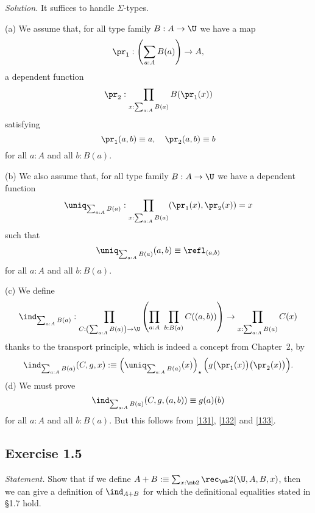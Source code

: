 \documentclass[12pt]{article}
\begin{document}
\nn\emph{Solution.} It suffices to handle $\Sigma$-types. 

\nn(a) We assume that, for all type family $B:A\to\U$ we have a map 
$$
\pr_1:\left(\sum_{a:A}B(a)\right)\to A,
$$ 
a dependent function 
$$
\pr_2:\prod_{x:\sum_{a:A}B(a)}B(\pr_1(x))
$$
satisfying
\begin{equation}\label{131}
\pr_1(a,b)\equiv a,\quad\pr_2(a,b)\equiv b
\end{equation}
for all $a:A$ and all $b:B(a)$.

\nn(b) We also assume that, for all type family $B:A\to\U$ we have a dependent function 
$$
\uniq_{\sum_{a:A}B(a)}:\prod_{x:\sum_{a:A}B(a)}(\pr_1(x),\pr_2(x))=x
$$ 
such that 
\begin{equation}\label{132}
\uniq_{\sum_{a:A}B(a)}(a,b)\equiv\refl_{(a,b)}
\end{equation}
for all $a:A$ and all $b:B(a)$. 

\nn(c) We define
$$
\ind_{\sum_{a:A}B(a)}:\prod_{C:\left(\sum_{a:A}B(a)\right)\to\U} 
\left(\prod_{a:A}\ \prod_{b:B(a)}C((a,b))\right) 
\to\prod_{x:\sum_{a:A}B(a)}C(x)
$$
thanks to the transport principle, which is indeed a concept from Chapter~2, by
\begin{equation}\label{133}
\ind_{\sum_{a:A}B(a)}(C,g,x):\equiv\left(\uniq_{\sum_{a:A}B(a)}(x)\right)_\star\Big(g\big(\pr_1(x)\big)\big(\pr_2(x)\big)\Big).
\end{equation}
(d) We must prove 
$$
\ind_{\sum_{a:A}B(a)}(C,g,(a,b))\equiv g(a)(b)
$$
for all $a:A$ and all $b:B(a)$. But this follows from \eqref{131}, \eqref{132} and \eqref{133}.


\subsection{Exercise 1.5}

\emph{Statement.} Show that if we define $A+B:\equiv\sum_{x:\mb2}\rec_\mb2(\U,A,B,x)$, then we can give a definition of $\ind_{A+B}$ for which the definitional equalities stated in \S1.7 hold.
\end{document}
